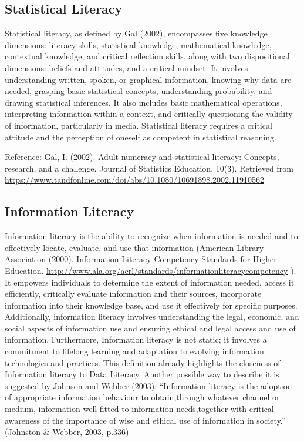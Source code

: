 \documentclass[
  12pt,
  a4paper,
  twoside]{article}
\begin{document}
\hypertarget{statistical-literacy}{%
\subsection{Statistical Literacy}\label{statistical-literacy}}

Statistical literacy, as defined by Gal (2002), encompasses five knowledge dimensions: literacy skills, statistical knowledge, mathematical knowledge, contextual knowledge, and critical reflection skills, along with two dispositional dimensions: beliefs and attitudes, and a critical mindset. It involves understanding written, spoken, or graphical information, knowing why data are needed, grasping basic statistical concepts, understanding probability, and drawing statistical inferences. It also includes basic mathematical operations, interpreting information within a context, and critically questioning the validity of information, particularly in media. Statistical literacy requires a critical attitude and the perception of oneself as competent in statistical reasoning.

Reference:
Gal, I. (2002). Adult numeracy and statistical literacy: Concepts, research, and a challenge. Journal of Statistics Education, 10(3). Retrieved from \url{https://www.tandfonline.com/doi/abs/10.1080/10691898.2002.11910562}

\hypertarget{information-literacy}{%
\subsection{Information Literacy}\label{information-literacy}}

Information literacy is the ability to recognize when information is needed and to effectively locate, evaluate, and use that information (American Library Association (2000). Information Literacy Competency Standards for Higher Education. \url{http://www.ala.org/acrl/standards/informationliteracycompetency} ). It empowers individuals to determine the extent of information needed, access it efficiently, critically evaluate information and their sources, incorporate information into their knowledge base, and use it effectively for specific purposes. Additionally, information literacy involves understanding the legal, economic, and social aspects of information use and ensuring ethical and legal access and use of information.
Furthermore, Information literacy is not static; it involves a commitment to lifelong learning and adaptation to evolving information technologies and practices.
This definition already highlights the closeness of Information literacy to Data Literacy.
Another possible way to describe it is suggested by Johnson and Webber (2003):
``Information literacy is the adoption of appropriate information behaviour to obtain,through whatever channel or medium, information well fitted to information needs,together with critical awareness of the importance of wise and ethical use of information in society.'' (Johnston \& Webber, 2003, p.336)
\end{document}
